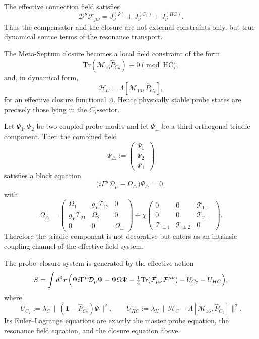 \begin{theorem}
\label{thm:resonance-field-eq}
The effective connection field satisfies
\[
  \mathcal D^\mu\mathcal F_{\mu\nu}
  =
  J^{(\Psi)}_\nu + J^{(C_7)}_\nu + J^{(HC)}_\nu.
\]
Thus the compensator and the closure are not external constraints only,
but true dynamical source terms of the resonance transport.
\end{theorem}

\begin{proposition}
\label{prop:closure-equation}
The Meta-Septum closure becomes a local field constraint of the form
\[
  \mathrm{Tr}(\mathcal M_{16}\hat P_{C_7})
  \equiv 0 \pmod{\mathrm{HC}},
\]
and, in dynamical form,
\[
  \mathcal H_C = \Lambda[\mathcal M_{16},\hat P_{C_7}],
\]
for an effective closure functional $\Lambda$.
Hence physically stable probe states are precisely those lying in the
$C_7$-sector.
\end{proposition}

\begin{proposition}
\label{prop:triadic-two-probe}
Let $\Psi_1,\Psi_2$ be two coupled probe modes and let $\Psi_\perp$ be a
third orthogonal triadic component.
Then the combined field
\[
  \Psi_{\triangle}
  :=
  \begin{pmatrix}
    \Psi_1\\
    \Psi_2\\
    \Psi_\perp
  \end{pmatrix}
\]
satisfies a block equation
\[
  \bigl(i\Gamma^\mu\mathcal D_\mu - \Omega_{\triangle}\bigr)
  \Psi_{\triangle}=0,
\]
with
\[
  \Omega_{\triangle}
  =
  \begin{pmatrix}
    \Omega_1 & g_Y\mathcal T_{12} & 0\\
    g_Y\mathcal T_{21} & \Omega_2 & 0\\
    0 & 0 & \Omega_\perp
  \end{pmatrix}
  +
  \chi
  \begin{pmatrix}
    0 & 0 & \mathcal T_{1\perp}\\
    0 & 0 & \mathcal T_{2\perp}\\
    \mathcal T_{\perp1} & \mathcal T_{\perp2} & 0
  \end{pmatrix}.
\]
Therefore the triadic component is not decorative but enters as an
intrinsic coupling channel of the effective field system.
\end{proposition}

\begin{theorem}
\label{thm:variational-form}
The probe--closure system is generated by the effective action
\[
  S
  =
  \int d^4x\,
  \Bigl(
    \bar\Psi i\Gamma^\mu\mathcal D_\mu\Psi
    - \bar\Psi\Omega\Psi
    - \tfrac14\mathrm{Tr}(\mathcal F_{\mu\nu}\mathcal F^{\mu\nu})
    - U_{C_7}
    - U_{HC}
  \Bigr),
\]
where
\[
  U_{C_7}
  :=
  \lambda_C\,
  \bigl\|(\mathbf 1-\hat P_{C_7})\Psi\bigr\|^2,
  \qquad
  U_{HC}
  :=
  \lambda_H\,
  \bigl\|\mathcal H_C - \Lambda[\mathcal M_{16},\hat P_{C_7}]\bigr\|^2.
\]
Its Euler--Lagrange equations are exactly the master probe equation,
the resonance field equation, and the closure equation above.
\end{theorem}

